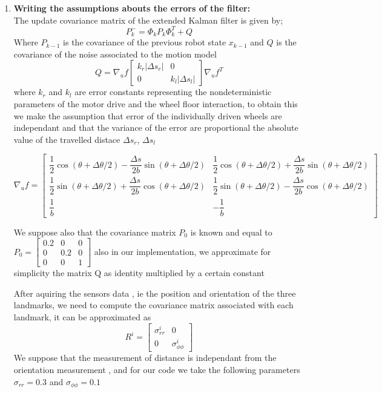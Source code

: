 \documentclass[11pt,a4paper]{report}
\begin{document}
\begin{enumerate}
\item\textbf{Writing the assumptions abouts the errors of the filter:}\\
The update covariance matrix of the extended Kalman filter is given by;
$$ P_{k}^- = \Phi_{k} P_{k} \Phi_{k}^T  + Q $$	
Where $P_{k-1}$ is the covariance of the previous robot state $x_{k-1}$ and $Q$ is the covariance of the noise associated to the motion model 
$$ Q = \nabla _{u}f \left [ \begin{array}{cc} k_{r}|\Delta s _{r}| & 0\\ 0 & k_{l} |\Delta s_{l}|\end{array} \right ] \nabla _{u}f^T $$
where $k_{r} $ and $k_{l}$ are error constants representing the nondeterministic parameters of the motor drive and the wheel floor interaction, to obtain this we make the assumption that error of the individually driven wheels are independant and that the variance of the error are proportional the absolute value of the travelled distace $\Delta s_{r} $, $\Delta s_{l}$
 
$$\nabla _{u} f = \left [\begin{array}{cc}  \dfrac{1}{2} \cos( \theta + \Delta \theta /2) - \dfrac{\Delta s}{2b}\sin(\theta + \Delta \theta /2) & \dfrac{1}{2} \cos( \theta + \Delta \theta /2) + \dfrac{\Delta s}{2b}\sin(\theta + \Delta \theta /2)\\
\dfrac{1}{2} \sin( \theta + \Delta \theta /2) + \dfrac{\Delta s}{2b}\cos(\theta + \Delta \theta /2) & \dfrac{1}{2} \sin( \theta + \Delta \theta /2) - \dfrac{\Delta s}{2b}\cos(\theta + \Delta \theta /2) \\
\dfrac{1}{b} & -\dfrac{1}{b} \end{array} \right] $$


We suppose also that the covariance matrix $P_{0}$ is known and equal to $P_{0} = \left [ \begin{array}{ccc} 0.2&0& 0 \\ 0 & 0.2 & 0\\ 0& 0& 1\end{array}\right ]$ also in our implementation, we approximate for simplicity the matrix Q as identity multiplied by a certain constant
 
After aquiring the sensors data , ie the position and orientation of the three landmarks, we need to compute the covariance matrix associated with each landmark, it can be approximated as 
$$ R^i = \left [ \begin{array}{cc} \sigma_{rr}^i & 0 \\ 0 & \sigma_{\phi \phi}^i\end{array} \right ] $$
We suppose  that the measurement of distance is independant from the orientation measurement , and for our code we take the following parameters $\sigma_{rr} =0.3 $ and $\sigma_{\phi\phi} = 0.1$ 


\end{enumerate}
\end{document}
